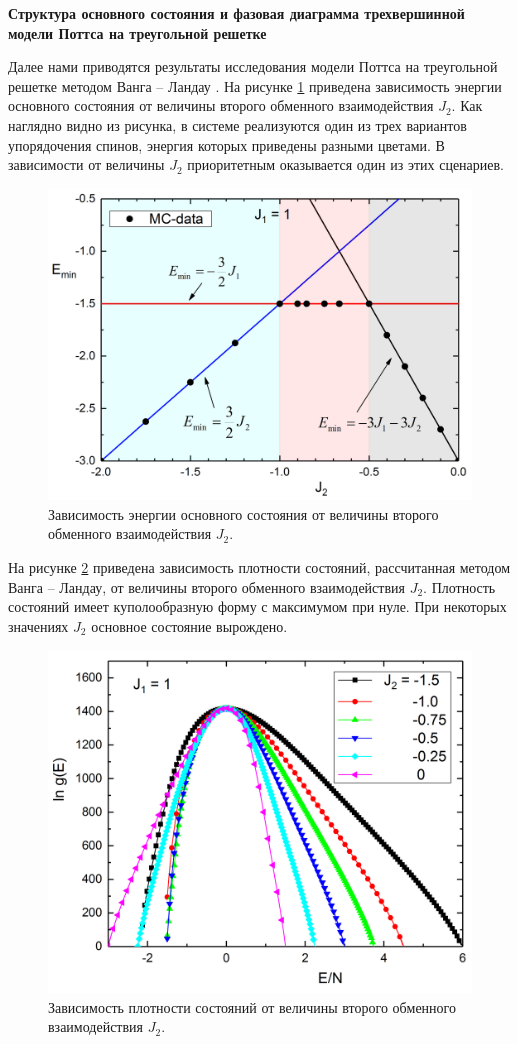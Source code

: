 \textbf{Структура основного состояния и фазовая диаграмма трехвершинной модели Поттса на треугольной решетке}

Далее нами приводятся результаты исследования модели Поттса на треугольной решетке методом Ванга -- Ландау \cite{ph3_4, ph3_5, ph3_6, ph3_7}. 
На рисунке \ref{phys3-pic-2} приведена зависимость энергии основного состояния от величины второго обменного взаимодействия $J_2$. Как наглядно видно из рисунка, в системе реализуются один из трех вариантов упорядочения спинов, энергия которых приведены разными цветами. В зависимости от величины $J_2$ приоритетным оказывается один из этих сценариев.

\begin{figure}[H]
	\centering
	\includegraphics[width=0.5\linewidth]{content/sections/images/phys3-2}
	\caption{Зависимость энергии основного состояния от величины второго обменного взаимодействия $J_2$.}
	\label{phys3-pic-2}
\end{figure}

На рисунке \ref{phys3-pic-3} приведена зависимость плотности состояний, рассчитанная методом Ванга -- Ландау, от величины второго обменного взаимодействия $J_2$. Плотность состояний имеет куполообразную форму с максимумом при нуле. При некоторых значениях $J_2$ основное состояние вырождено.

\begin{figure}[H]
	\centering
	\includegraphics[width=0.5\linewidth]{content/sections/images/phys3-3}
	\caption{Зависимость плотности состояний от величины второго обменного взаимодействия $J_2$.}
	\label{phys3-pic-3}
\end{figure}

